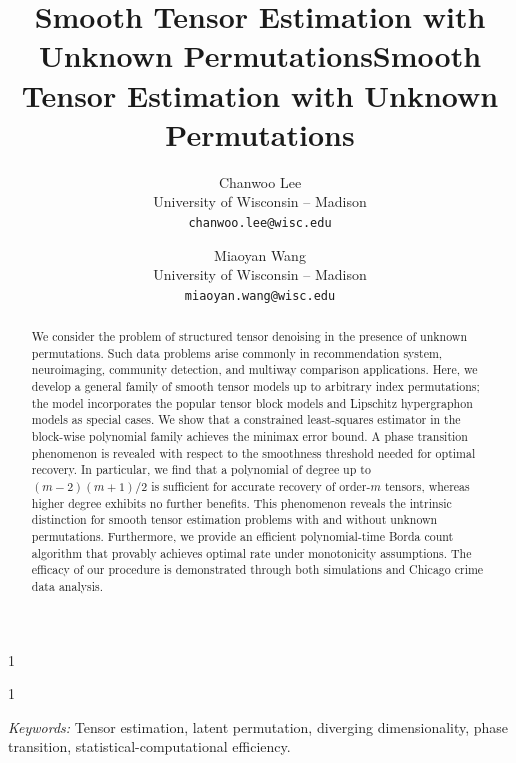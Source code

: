 \documentclass[11pt]{article}
\newcommand{\blind}{1}
\theoremstyle{definition}
\begin{document}
\blind
{ \title{Smooth Tensor Estimation with Unknown Permutations}
 \date{}
\author{%
Chanwoo Lee \\
University of Wisconsin -- Madison\\
\texttt{chanwoo.lee@wisc.edu} \\
\and
Miaoyan Wang \\
University of Wisconsin -- Madison\\
\texttt{miaoyan.wang@wisc.edu} \\
}

    \maketitle
} \fi

\blind
{
 \date{}
  \title{Smooth Tensor Estimation with Unknown Permutations}
\author{}
\maketitle
} \fi

\begin{abstract}%
 We consider the problem of structured tensor denoising in the presence of unknown permutations. Such data problems arise commonly in recommendation system, neuroimaging, community detection, and multiway comparison applications. Here, we develop a general family of smooth tensor models up to arbitrary index permutations; the model incorporates the popular tensor block models and Lipschitz hypergraphon models as special cases. We show that a constrained least-squares estimator in the block-wise polynomial family achieves the minimax error bound. A phase transition phenomenon is revealed with respect to the smoothness threshold needed for optimal recovery. In particular, we find that a polynomial of degree up to {\footnotesize $(m-2)(m+1)/2$} is sufficient for accurate recovery of order-$m$ tensors, whereas higher degree exhibits no further benefits. This phenomenon reveals the intrinsic distinction for smooth tensor estimation problems with and without unknown permutations. Furthermore, we provide an efficient polynomial-time Borda count algorithm that provably achieves optimal rate under monotonicity assumptions. The efficacy of our procedure is demonstrated through both simulations and Chicago crime data analysis. 
  \end{abstract}


\noindent%
{\it Keywords:} Tensor estimation, latent permutation, diverging dimensionality, phase transition, statistical-computational efficiency. 
\end{document}
